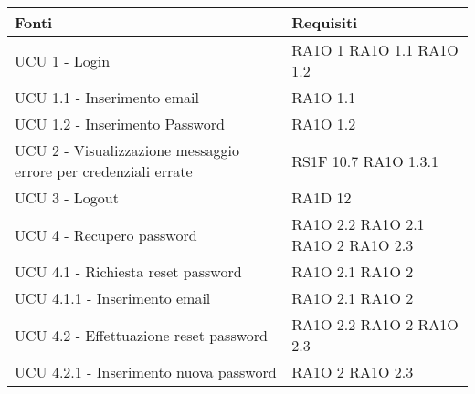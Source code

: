       \begin{center}
      \bgroup
      \def\arraystretch{1.8}
      \begin{longtable}{ | p{5cm} | p{5cm} |}
    
      \cellcolor[gray]{0.9} \textbf{Fonti} & \cellcolor[gray]{0.9} \textbf{Requisiti} \\ \hline       
            UCU 1 - Login &  RA1O 1 \newline  RA1O 1.1 \newline  RA1O 1.2 \newline  \\ \hline      
            UCU 1.1 - Inserimento email &  RA1O 1.1 \newline  \\ \hline      
            UCU 1.2 - Inserimento Password &  RA1O 1.2 \newline  \\ \hline      
            UCU 2 - Visualizzazione messaggio errore per credenziali errate &  RS1F 10.7 \newline  RA1O 1.3.1 \newline  \\ \hline      
            UCU 3 - Logout &  RA1D 12 \newline  \\ \hline      
            UCU 4 - Recupero password &  RA1O 2.2 \newline  RA1O 2.1 \newline  RA1O 2 \newline  RA1O 2.3 \newline  \\ \hline      
            UCU 4.1 - Richiesta reset password &  RA1O 2.1 \newline  RA1O 2 \newline  \\ \hline      
            UCU 4.1.1 - Inserimento email &  RA1O 2.1 \newline  RA1O 2 \newline  \\ \hline      
            UCU 4.2 - Effettuazione reset password &  RA1O 2.2 \newline  RA1O 2 \newline  RA1O 2.3 \newline  \\ \hline      
            UCU 4.2.1 - Inserimento nuova password &  RA1O 2 \newline  RA1O 2.3 \newline  \\ \hline      

\end{longtable}
\end{center}

